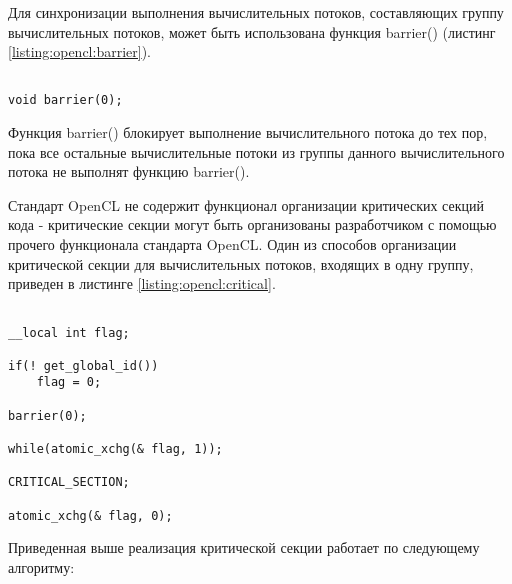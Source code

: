 		Для синхронизации выполнения вычислительных потоков, составляющих группу вычислительных потоков, может быть использована функция barrier() (листинг \ref{listing:opencl:barrier}).

\begin{lstlisting}

void barrier(0);

\end{lstlisting}
\mylistingend

		Функция barrier() блокирует выполнение вычислительного потока до тех пор, пока все остальные вычислительные потоки из группы данного вычислительного потока не выполнят функцию barrier().

		Стандарт OpenCL не содержит функционал организации критических секций кода - критические секции могут быть организованы разработчиком с помощью прочего функционала стандарта OpenCL. Один из способов организации критической секции для вычислительных потоков, входящих в одну группу, приведен в листинге \ref{listing:opencl:critical}.

\begin{lstlisting}

__local int flag;

if(! get_global_id())
	flag = 0;

barrier(0);

while(atomic_xchg(& flag, 1));

CRITICAL_SECTION;

atomic_xchg(& flag, 0);

\end{lstlisting}
\mylistingend

	Приведенная выше реализация критической секции работает по следующему алгоритму:

